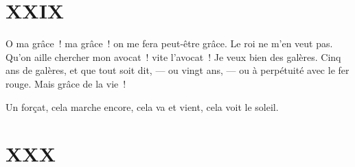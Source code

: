 \documentclass[french,twoside]{book} %
\begin{document}
 \section[{XXIX}]{XXIX}
\label{ch29}\renewcommand{\leftmark}{XXIX}

\noindent O ma grâce ! ma grâce ! on me fera peut-être grâce. Le roi ne m’en veut pas. Qu’on aille chercher mon avocat ! vite l’avocat ! Je veux bien des galères. Cinq ans de galères, et que tout soit dit, — ou vingt ans, — ou à perpétuité avec le fer rouge. Mais grâce de la vie !\par
Un forçat, cela marche encore, cela va et vient, cela voit le soleil.
 \section[{XXX}]{XXX}
\label{ch30}\renewcommand{\leftmark}{XXX}
\end{document}
